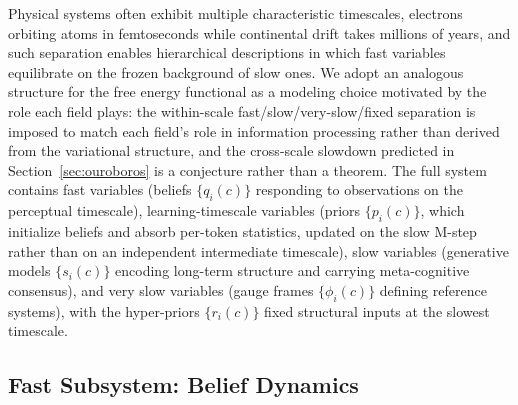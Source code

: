\documentclass[11pt]{article}
\begin{document}
Physical systems often exhibit multiple characteristic timescales, electrons orbiting atoms in femtoseconds while continental drift takes millions of years, and such separation enables hierarchical descriptions in which fast variables equilibrate on the frozen background of slow ones. We adopt an analogous structure for the free energy functional as a modeling choice motivated by the role each field plays: the within-scale fast/slow/very-slow/fixed separation is imposed to match each field's role in information processing rather than derived from the variational structure, and the cross-scale slowdown predicted in Section~\ref{sec:ouroboros} is a conjecture rather than a theorem. The full system contains fast variables (beliefs $\{q_i(c)\}$ responding to observations on the perceptual timescale), learning-timescale variables (priors $\{p_i(c)\}$, which initialize beliefs and absorb per-token statistics, updated on the slow M-step rather than on an independent intermediate timescale), slow variables (generative models $\{s_i(c)\}$ encoding long-term structure and carrying meta-cognitive consensus), and very slow variables (gauge frames $\{\phi_i(c)\}$ defining reference systems), with the hyper-priors $\{r_i(c)\}$ fixed structural inputs at the slowest timescale.

\subsection{Fast Subsystem: Belief Dynamics}
\end{document}
